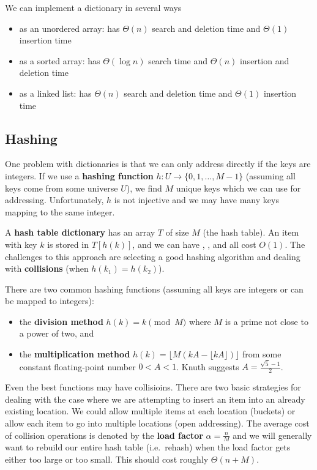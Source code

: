 \documentclass[12pt]{article}
\begin{document}
We can implement a dictionary in several ways
\begin{itemize}
\item as an unordered array: has $\Theta(n)$ search and deletion time and $\Theta(1)$ insertion time
\item as a sorted array: has $\Theta(\log n)$ search time and $\Theta(n)$ insertion and deletion time
\item as a linked list: has $\Theta(n)$ search and deletion time and $\Theta(1)$ insertion time
\end{itemize}

\subsection{Hashing}
One problem with dictionaries is that we can only address directly if the keys are integers. If we use a {\bf hashing function} $h: U \to \{0, 1, \dots, M-1\}$ (assuming all keys come from some universe $U$), we find $M$ unique keys which we can use for addressing. Unfortunately, $h$ is not injective and we may have many keys mapping to the same integer.

A {\bf hash table dictionary} has an array $T$ of size $M$ (the hash table). An item with key $k$ is stored in $T[h(k)]$, and we can have , , and  all cost $O(1)$. The challenges to this approach are selecting a good hashing algorithm and dealing with {\bf collisions} (when $h(k_1) = h(k_2)$).

There are two common hashing functions (assuming all keys are integers or can be mapped to integers):
\begin{itemize}
\item the {\bf division method} $h(k) = k \pmod M$ where $M$ is a prime not close to a power of two, and
\item the {\bf multiplication method} $h(k) = \lfloor M(kA - \lfloor kA \rfloor)\rfloor$ from some constant floating-point number $0 < A < 1$. Knuth suggests $A = \frac{\sqrt{5} - 1}{2}$.
\end{itemize}

Even the best functions may have collisioins. There are two basic strategies for dealing with the case where we are attempting to insert an item into an already existing location. We could allow multiple items at each location (buckets) or allow each item to go into multiple locations (open addressing). The average cost of collision operations is denoted by the {\bf load factor} $\alpha = \frac{n}{M}$ and we will generally want to rebuild our entire hash table (i.e.\ rehash) when the load factor gets either too large or too small. This should cost roughly $\Theta(n + M)$.
\end{document}
